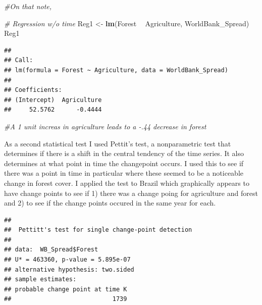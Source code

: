 \documentclass[12pt,]{article}
\newenvironment{Shaded}{\begin{snugshade}}{\end{snugshade}}
\newcommand{\KeywordTok}[1]{\textcolor[rgb]{0.13,0.29,0.53}{\textbf{#1}}}
\newcommand{\StringTok}[1]{\textcolor[rgb]{0.31,0.60,0.02}{#1}}
\newcommand{\CommentTok}[1]{\textcolor[rgb]{0.56,0.35,0.01}{\textit{#1}}}
\newcommand{\OperatorTok}[1]{\textcolor[rgb]{0.81,0.36,0.00}{\textbf{#1}}}
\newcommand{\NormalTok}[1]{#1}
\begin{document}
\begin{Shaded}
\begin{Highlighting}[]
\CommentTok{#On that note, }

\CommentTok{# Regression w/o time }
\NormalTok{Reg1 <-}\StringTok{ }\KeywordTok{lm}\NormalTok{(Forest }\OperatorTok{~}\StringTok{ }\NormalTok{Agriculture, WorldBank_Spread)}
\NormalTok{Reg1}
\end{Highlighting}
\end{Shaded}

\begin{verbatim}
## 
## Call:
## lm(formula = Forest ~ Agriculture, data = WorldBank_Spread)
## 
## Coefficients:
## (Intercept)  Agriculture  
##     52.5762      -0.4444
\end{verbatim}

\begin{Shaded}
\begin{Highlighting}[]
\CommentTok{#A 1 unit increas in agriculture leads to a -.44 decrease in forest }
\end{Highlighting}
\end{Shaded}

As a second statistical test I used Pettit's test, a nonparametric test
that determines if there is a shift in the central tendency of the time
series. It also determines at what point in time the changepoint occurs.
I used this to see if there was a point in time in particular where
these seemed to be a noticeable change in forest cover. I applied the
test to Brazil which graphically appears to have change points to see if
1) there was a change poing for agriculture and forest and 2) to see if
the change points occured in the same year for each.

\begin{Shaded}
\end{Shaded}

\begin{verbatim}
## 
##  Pettitt's test for single change-point detection
## 
## data:  WB_Spread$Forest
## U* = 463360, p-value = 5.895e-07
## alternative hypothesis: two.sided
## sample estimates:
## probable change point at time K 
##                            1739
\end{verbatim}
\end{document}

